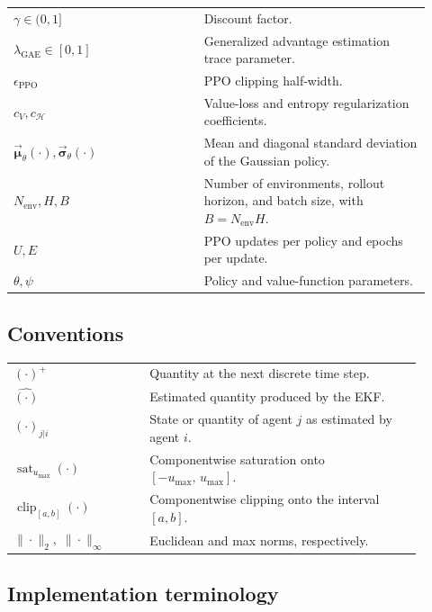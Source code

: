 \begin{longtable}{>{\raggedright\arraybackslash}p{0.42\linewidth}
                  >{\raggedright\arraybackslash}p{0.50\linewidth}}
\(\gamma \in (0,1]\) & Discount factor.\\
\(\lambda_{\mathrm{GAE}}\in[0,1]\) & Generalized advantage estimation trace parameter.\\
\(\epsilon_{\mathrm{PPO}}\) & PPO clipping half-width.\\
\(c_V, c_{\mathcal{H}}\) & Value-loss and entropy regularization coefficients.\\
\(\vec{\boldsymbol{\mu}}_\theta(\cdot),\vec{\boldsymbol{\sigma}}_\theta(\cdot)\) & Mean and diagonal standard deviation of the Gaussian policy.\\
\(N_{\mathrm{env}},H,B\) & Number of environments, rollout horizon, and batch size, with \(B=N_{\mathrm{env}}H\).\\
\(U,E\) & PPO updates per policy and epochs per update.\\
\(\theta,\psi\) & Policy and value-function parameters.\\
\end{longtable}

\subsection{Conventions}
\label{appendix:methodology-conventions}

\begin{center}
\renewcommand{\arraystretch}{1.15}
\begin{tabular}{p{0.30\linewidth}p{0.60\linewidth}}
\((\cdot)^{+}\) & Quantity at the next discrete time step.\\
\(\hat{(\cdot)}\) & Estimated quantity produced by the EKF.\\
\((\cdot)_{j|i}\) & State or quantity of agent \(j\) as estimated by agent \(i\).\\
\(\operatorname{sat}_{u_{\max}}(\cdot)\) & Componentwise saturation onto \([ -u_{\max},\,u_{\max}]\).\\
\(\operatorname{clip}_{[a,b]}(\cdot)\) & Componentwise clipping onto the interval \([a,b]\).\\
\(\|\cdot\|_2,\;\|\cdot\|_\infty\) & Euclidean and max norms, respectively.\\
\end{tabular}
\end{center}

\subsection{Implementation terminology}
\label{appendix:methodology-implementation-terminology}

